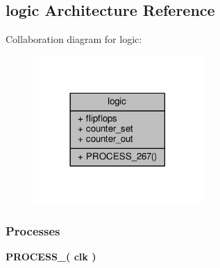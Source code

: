 \subsection{logic Architecture Reference}
\label{classdebounce_1_1logic}


Collaboration diagram for logic\+:\nopagebreak
\begin{figure}[H]
\begin{center}
\leavevmode
\includegraphics[width=182pt]{d3/d96/classdebounce_1_1logic__coll__graph}
\end{center}
\end{figure}
\subsubsection*{Processes}
 \begin{DoxyCompactItemize}
\item 
{\bf P\+R\+O\+C\+E\+S\+S\+\_}{\bfseries  ( {\bfseries {\bfseries {\bf clk}} \textcolor{vhdlchar}{ }} )}
\end{DoxyCompactItemize}
